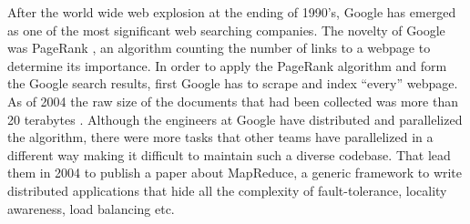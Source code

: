 After the world wide web explosion at the ending of 1990's, Google has
emerged as one of the most significant web searching companies.
The novelty of Google was PageRank \cite{ilprints361}, an
algorithm counting the number of links to a webpage to determine its
importance. In order to apply the PageRank algorithm and form the
Google search results, first Google has to scrape and index ``every''
webpage. As of 2004 the raw size of the documents that had been
collected was more than 20 terabytes
\cite{Dean:2004:MSD:1251254.1251264}. Although the engineers at Google
have distributed and parallelized the algorithm, there were more tasks
that other teams have parallelized in a different way making it
difficult to maintain such a diverse codebase. That lead them in 2004
to publish a paper about MapReduce, a generic framework to write distributed
applications that hide all the complexity of fault-tolerance, locality
awareness, load balancing etc.